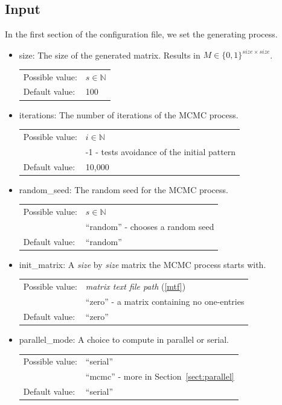 \subsection{Input}
In the first section of the configuration file, we set the generating process.
\begin{itemize}
\item size: The size of the generated matrix. Results in $M\in\{0,1\}^{size\times size}$.

\begin{tabular}{ll}
Possible value: & $s\in\mathbb{N}$ \\
Default value: & 100
\end{tabular}

\item iterations: The number of iterations of the MCMC process.

\begin{tabular}{ll}
Possible value: & $i\in\mathbb{N}$ \\
& -1 - tests avoidance of the initial pattern \\
Default value: & 10,000
\end{tabular}

\item random\_seed: The random seed for the MCMC process.

\begin{tabular}{ll}
Possible value: & $s\in\mathbb{N}$ \\
& ``random'' - chooses a random seed \\
Default value: & ``random''
\end{tabular}

\item init\_matrix: A \textit{size} by \textit{size} matrix the MCMC process starts with.

\begin{tabular}{ll}
Possible value: & \textit{matrix text file path} (\ref{mtf}) \\
& ``zero'' - a matrix containing no one-entries \\
Default value: & ``zero''
\end{tabular}

\item parallel\_mode: A choice to compute in parallel or serial.

\begin{tabular}{ll}
Possible value: & ``serial'' \\
& ``mcmc'' - more in Section~\ref{sect:parallel} \\
Default value: & ``serial''
\end{tabular}


\end{itemize}
